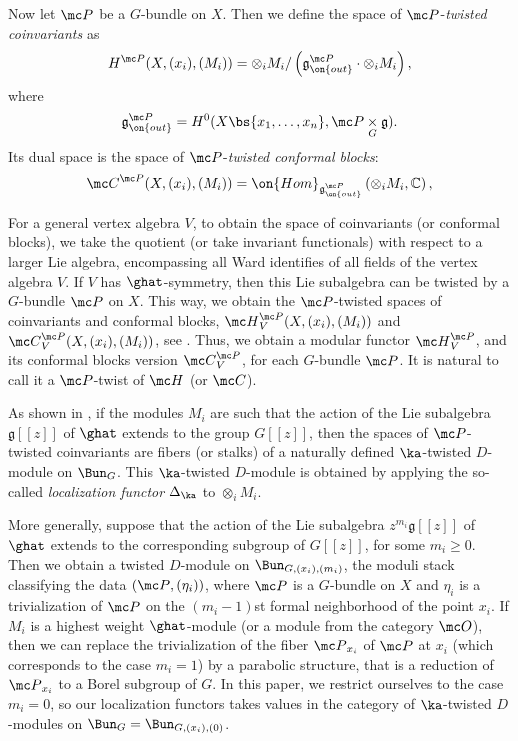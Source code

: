\documentclass[11pt,reqno]{amsart}
\theoremstyle{plain}
\numberwithin{equation}{section}
\newcommand{\C}{\mathbb{C}}
\newcommand{\g}{\mathfrak{g}}
\theoremstyle{definition}
\begin{document}
Now let ${\mc P}$ be a $G$-bundle on $X$. Then we define the space of
${\mc P}$-{\em twisted coinvariants} as
$$
H^{\mc P}(X,(x_i),(M_i)) = \otimes_i M_i / \left( \g^{\mc P}_{\on{out}} \cdot
  \otimes_i M_i \right),
$$
where
$$
\g^{\mc P}_{\on{out}} = H^0(X \bs \{ x_1,\ldots,x_n \},{\mc P}
\underset{G}\times \g).
$$
Its dual space is the space of ${\mc P}$-{\em twisted conformal
  blocks}:
$$
{\mc C}^{\mc P}(X,(x_i),(M_i)) =
\on{Hom}_{\g^{\mc P}_{\on{out}}}\left(\otimes_i M_i,\C\right),
$$

For a general vertex algebra $V$, to obtain the space of coinvariants
(or conformal blocks), we take the quotient (or take invariant
functionals) with respect to a larger Lie algebra, encompassing all
Ward identifies of all fields of the vertex algebra $V$. If $V$ has
$\ghat$-symmetry, then this Lie subalgebra can be twisted by a
$G$-bundle ${\mc P}$ on $X$. This way, we obtain the ${\mc P}$-twisted
spaces of coinvariants and conformal blocks, ${\mc H}_V^{\mc
  P}(X,(x_i),(M_i))$ and ${\mc C}_V^{\mc P}(X,(x_i),(M_i))$, see
\cite{FB}. Thus, we obtain a modular functor ${\mc H}_V^{\mc P}$, and
its conformal blocks version ${\mc C}_V^{\mc P}$, for each $G$-bundle
${\mc P}$. It is natural to call it a ${\mc P}$-twist of ${\mc H}$ (or
${\mc C}$).

As shown in \cite{FB}, if the modules $M_i$ are such that the action
of the Lie subalgebra $\g[[z]]$ of $\ghat$ extends to the group
$G[[z]]$, then the spaces of ${\mc P}$-twisted coinvariants are fibers
(or stalks) of a naturally defined $\ka$-twisted $D$-module on
$\Bun_G$. This $\ka$-twisted $D$-module is obtained by applying the
so-called {\em localization functor} $\Delta_\ka$ to $\otimes_i M_i$.

More generally, suppose that the action of the Lie subalgebra
$z^{m_i}\g[[z]]$ of $\ghat$ extends to the corresponding subgroup of
$G[[z]]$, for some $m_i\geq 0$. Then we obtain a twisted $D$-module on
$\Bun_{G,(x_i),(m_i)}$, the moduli stack classifying the data $({\mc
  P},(\eta_i))$, where ${\mc P}$ is a $G$-bundle on $X$ and $\eta_i$
is a trivialization of ${\mc P}$ on the $(m_i-1)$st formal
neighborhood of the point $x_i$. If $M_i$ is a highest weight
$\ghat$-module (or a module from the category ${\mc O}$), then we can
replace the trivialization of the fiber ${\mc P}_{x_i}$ of ${\mc P}$
at $x_i$ (which corresponds to the case $m_i=1$) by a parabolic
structure, that is a reduction of ${\mc P}_{x_i}$ to a Borel subgroup
of $G$. In this paper, we restrict ourselves to the case $m_i=0$, so
our localization functors takes values in the category of
$\ka$-twisted $D$-modules on $\Bun_G = \Bun_{G,(x_i),(0)}$.
\end{document}
